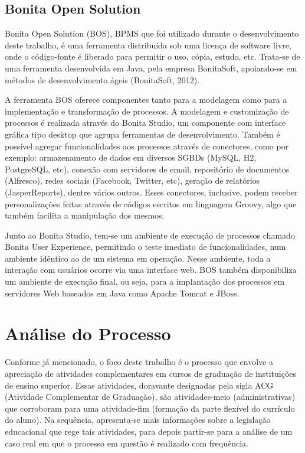 \documentclass[12pt]{article}
\begin{document}
\subsection{Bonita Open Solution}

Bonita Open Solution (BOS), BPMS que foi utilizado durante o desenvolvimento deste trabalho, é uma ferramenta distribuída sob uma licença de software livre, onde o código-fonte é liberado para permitir o uso, cópia, estudo, etc. Trata-se de uma ferramenta desenvolvida em Java, pela empresa BonitaSoft, apoiando-se em métodos de desenvolvimento ágeis (BonitaSoft, 2012).

A ferramenta BOS oferece componentes tanto para a modelagem como para a implementação e transformação de processos. A modelagem e customização de processos é realizada através do Bonita Studio, um componente com interface gráfica tipo desktop que agrupa ferramentas de desenvolvimento. Também é possível agregar funcionalidades aos processos através de conectores, como por exemplo: armazenamento de dados em diversos SGBDs (MySQL, H2, PostgreSQL, etc), conexão com servidores de email, repositório de documentos (Alfresco), redes sociais (Facebook, Twitter, etc), geração de relatórios (JasperReports), dentre vários outros. Esses conectores, inclusive, podem receber personalizações feitas através de códigos escritos em linguagem Groovy, algo que também facilita a manipulação dos mesmos.

Junto ao Bonita Studio, tem-se um ambiente de execução de processos chamado Bonita User Experience, permitindo o teste imediato de funcionalidades, num ambiente idêntico ao de um sistema em operação. Nesse ambiente, toda a interação com usuários ocorre via uma interface web. BOS também disponibiliza um ambiente de execução final, ou seja, para a implantação dos processos em servidores Web baseados em Java como Apache Tomcat e JBoss.

\section{Análise do Processo}

Conforme já mencionado, o foco deste trabalho é o processo que envolve a apreciação de atividades complementares em cursos de graduação de instituições de ensino superior. Essas atividades, doravante designadas pela sigla ACG (Atividade Complementar de Graduação), são atividades-meio (administrativas) que corroboram para uma atividade-fim (formação da parte flexível do currículo do aluno). Na sequência, apresenta-se mais informações sobre a legislação educacional que rege tais atividades, para depois partir-se para a análise de um caso real em que o processo em questão é realizado com frequência.
\end{document}
